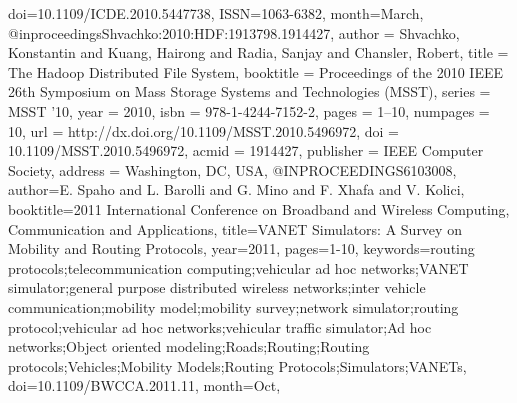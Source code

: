 \documentclass{thesis}
\begin{document}
\begin{singlespace}
\begin{thebibliography}{99}
{doi={10.1109/ICDE.2010.5447738}, 
ISSN={1063-6382}, 
month={March},}
@inproceedings{Shvachko:2010:HDF:1913798.1914427,
 author = {Shvachko, Konstantin and Kuang, Hairong and Radia, Sanjay and Chansler, Robert},
 title = {The Hadoop Distributed File System},
 booktitle = {Proceedings of the 2010 IEEE 26th Symposium on Mass Storage Systems and Technologies (MSST)},
 series = {MSST '10},
 year = {2010},
 isbn = {978-1-4244-7152-2},
 pages = {1--10},
 numpages = {10},
 url = {http://dx.doi.org/10.1109/MSST.2010.5496972},
 doi = {10.1109/MSST.2010.5496972},
 acmid = {1914427},
 publisher = {IEEE Computer Society},
 address = {Washington, DC, USA},
} 
@INPROCEEDINGS{6103008, 
author={E. Spaho and L. Barolli and G. Mino and F. Xhafa and V. Kolici}, 
booktitle={2011 International Conference on Broadband and Wireless Computing, Communication and Applications}, 
title={VANET Simulators: A Survey on Mobility and Routing Protocols}, 
year={2011}, 
pages={1-10}, 
keywords={routing protocols;telecommunication computing;vehicular ad hoc networks;VANET simulator;general purpose distributed wireless networks;inter vehicle communication;mobility model;mobility survey;network simulator;routing protocol;vehicular ad hoc networks;vehicular traffic simulator;Ad hoc networks;Object oriented modeling;Roads;Routing;Routing protocols;Vehicles;Mobility Models;Routing Protocols;Simulators;VANETs}, 
doi={10.1109/BWCCA.2011.11}, 
month={Oct},}
    
\end{thebibliography}
\end{singlespace}
\end{document}
